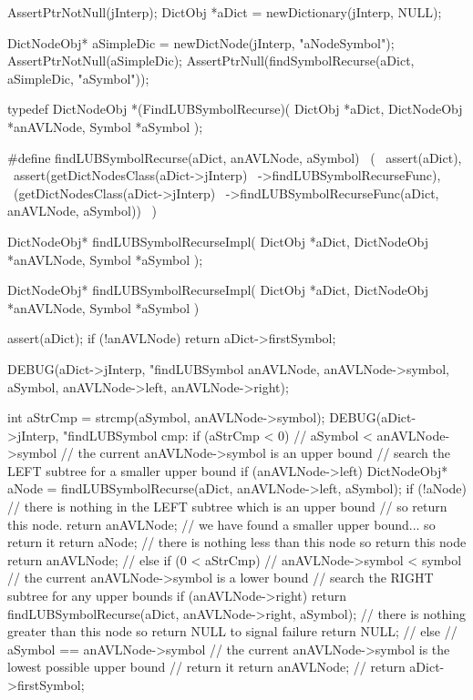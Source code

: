 \startCTest
  AssertPtrNotNull(jInterp);
  DictObj *aDict = newDictionary(jInterp, NULL);

  DictNodeObj* aSimpleDic = newDictNode(jInterp, "aNodeSymbol");
  AssertPtrNotNull(aSimpleDic);
  AssertPtrNull(findSymbolRecurse(aDict, aSimpleDic, "aSymbol"));
\stopCTest
\stopTestCase
\stopTestSuite

\startTestSuite[findLUBSymbolRecurse]

\startCHeader
typedef DictNodeObj *(FindLUBSymbolRecurse)(
  DictObj     *aDict,
  DictNodeObj *anAVLNode,
  Symbol      *aSymbol
);

#define findLUBSymbolRecurse(aDict, anAVLNode, aSymbol)       \
  (                                                           \
    assert(aDict),                                            \
    assert(getDictNodesClass(aDict->jInterp)                  \
      ->findLUBSymbolRecurseFunc),                            \
    (getDictNodesClass(aDict->jInterp)                        \
      ->findLUBSymbolRecurseFunc(aDict, anAVLNode, aSymbol))  \
  )
\stopCHeader

\setCHeaderStream{private}
\startCHeader
DictNodeObj* findLUBSymbolRecurseImpl(
  DictObj     *aDict,
  DictNodeObj *anAVLNode,
  Symbol      *aSymbol
);
\stopCHeader
{}

\startCCode
DictNodeObj* findLUBSymbolRecurseImpl(
  DictObj     *aDict,
  DictNodeObj *anAVLNode,
  Symbol      *aSymbol
) {
  assert(aDict);
  if (!anAVLNode) return aDict->firstSymbol;

  DEBUG(aDict->jInterp,
        "findLUBSymbol %
        anAVLNode, anAVLNode->symbol, aSymbol,
        anAVLNode->left, anAVLNode->right);

  int aStrCmp = strcmp(aSymbol, anAVLNode->symbol);
  DEBUG(aDict->jInterp, "findLUBSymbol cmp: %
  if (aStrCmp < 0) {
    // aSymbol < anAVLNode->symbol
    // the current anAVLNode->symbol is an upper bound
    // search the LEFT subtree for a smaller upper bound
    if (anAVLNode->left) {
      DictNodeObj* aNode = findLUBSymbolRecurse(aDict, anAVLNode->left, aSymbol);
      if (!aNode) {
        // there is nothing in the LEFT subtree which is an upper bound
        // so return this node.
        return anAVLNode;
      }
      // we have found a smaller upper bound... so return it
      return aNode;
    }
    // there is nothing less than this node so return this node
    return anAVLNode;
    //
  } else if (0 < aStrCmp) {
    // anAVLNode->symbol < symbol
    // the current anAVLNode->symbol is a lower bound
    // search the RIGHT subtree for any upper bounds
    if (anAVLNode->right) {
      return findLUBSymbolRecurse(aDict, anAVLNode->right, aSymbol);
    }
    // there is nothing greater than this node so return NULL to signal failure
    return NULL;
    //
  } else {
    // aSymbol == anAVLNode->symbol
    // the current anAVLNode->symbol is the lowest possible upper bound
    // return it
    return anAVLNode;
    //
  }
  return aDict->firstSymbol;
}
\stopCCode
\stopTestSuite
